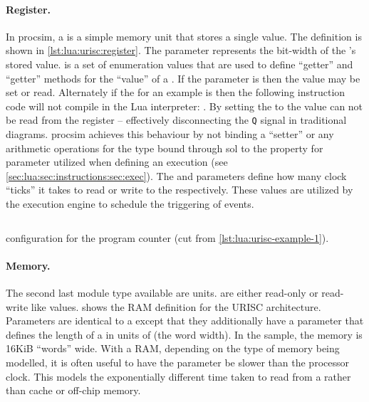 \paragraph{Register.} In procsim, a  is a simple memory unit that stores a single value. The  definition is shown in \cref{lst:lua:urisc:register}. The  parameter represents the bit-width of the 's stored value.  is a set of enumeration values that are used to define ``getter'' and ``getter'' methods for the ``value'' of a . If the  parameter is  then the value may be set or read. Alternately if the  for an example   is  then the following instruction code will not compile in the Lua interpreter: . By setting the  to  the value can not be read from the register -- effectively disconnecting the \verb|Q| signal in traditional  diagrams. procsim achieves this behaviour by not binding a ``setter'' or any arithmetic operations for the  type bound through sol to the property for  parameter utilized when defining an  execution (see \cref{sec:lua:sec:instructions:sec:exec}). The  and  parameters define how many clock ``ticks'' it takes to read or write to the  respectively. These values are utilized by the execution engine to schedule the triggering of events.

\begin{listing}[th!]
    \inputminted[escapeinside=||, firstline=17, lastline=23]{lua}{./listings/urisc.lua}
    \caption{ configuration for the program counter (cut from \cref{lst:lua:urisc-example-1}).}
    \label{lst:lua:urisc:register}
\end{listing}

\paragraph{Memory.} The second last module type available are  units.  are either read-only or read-write like  values.  shows the RAM definition for the URISC architecture. Parameters are identical to a  except that they additionally have a  parameter that defines the length of a  in units of  (the word width). In the sample, the memory is 16KiB ``words'' wide. With a RAM, depending on the type of memory being modelled, it is often useful to have the  parameter be slower than the processor clock. This models the exponentially different time taken to read from a  rather than cache or off-chip memory.

